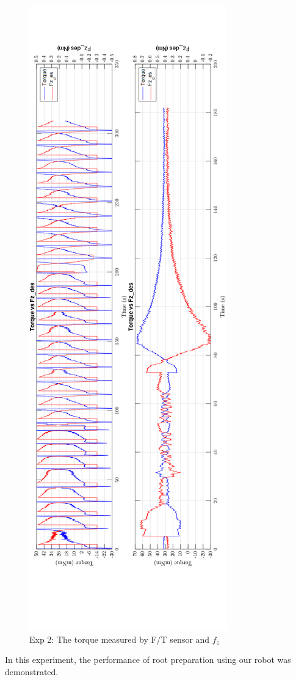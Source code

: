 \begin{figure}[htbp]
\begin{center}
\includegraphics[width=1\linewidth]{Images/exp/exp2_torque.png}
\caption{Exp 2: The torque measured by F/T sensor and $f_z$}
\label{fig: exp2_torque}
\end{center}
\end{figure}	
 In this experiment, the performance of root preparation using our robot was demonstrated. 